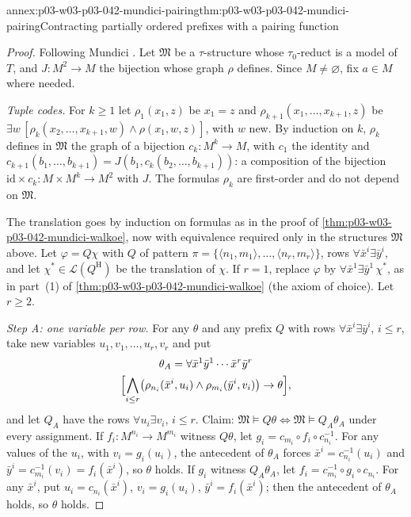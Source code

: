 \begin{annexitem}{annex:p03-w03-p03-042-mundici-pairing}{thm:p03-w03-p03-042-mundici-pairing}{Contracting partially ordered prefixes with a pairing function}
\begin{proof}
Following Mundici \cite[p.~214]{Mundici1985OtherQuantifiers}.  Let
\(\mathfrak M\) be a \(\tau\)-structure whose \(\tau_0\)-reduct is a model
of \(T\), and \(J:M^2\to M\) the bijection whose graph \(\rho\) defines.
Since \(M\neq\varnothing\), fix \(a\in M\) where needed.

\emph{Tuple codes.}  For \(k\geq1\) let \(\rho_1(x_1,z)\) be \(x_1=z\) and
\(\rho_{k+1}(x_1,\ldots,x_{k+1},z)\) be \(\exists w\,[\rho_k(x_2,\ldots,
x_{k+1},w)\wedge\rho(x_1,w,z)]\), with \(w\) new.  By induction on \(k\),
\(\rho_k\) defines in \(\mathfrak M\) the graph of a bijection
\(c_k:M^k\to M\), with \(c_1\) the identity and
\(c_{k+1}(b_1,\ldots,b_{k+1})=J(b_1,c_k(b_2,\ldots,b_{k+1}))\): a
composition of the bijection \(\mathrm{id}\times c_k:M\times M^k\to M^2\)
with \(J\).  The formulas \(\rho_k\) are first-order and do not depend
on \(\mathfrak M\).

The translation goes by induction on formulas as in the proof of
\cref{thm:p03-w03-p03-042-mundici-walkoe}, now with equivalence required
only in the structures \(\mathfrak M\) above.  Let \(\varphi=Q\chi\) with
\(Q\) of pattern \(\pi=\{\langle n_1,m_1\rangle,\ldots,\langle
n_r,m_r\rangle\}\), rows \(\forall\bar x^i\exists\bar y^i\), and let
\(\chi^\ast\in\mathscr L(Q^{\mathrm H})\) be the translation of \(\chi\).
If \(r=1\), replace \(\varphi\) by \(\forall\bar x^1\exists\bar
y^1\,\chi^\ast\), as in part~(1) of
\cref{thm:p03-w03-p03-042-mundici-walkoe} (the axiom of choice).  Let
\(r\geq2\).

\emph{Step A: one variable per row.}  For any \(\theta\) and any prefix
\(Q\) with rows \(\forall\bar x^i\exists\bar y^i\), \(i\le r\), take new
variables \(u_1,v_1,\ldots,u_r,v_r\) and put
\begin{multline*}
 \theta_A=\forall\bar x^1\bar y^1\cdots\bar x^r\bar y^r\\
 \Bigl[\bigwedge_{i\le r}\bigl(\rho_{n_i}(\bar x^i,u_i)\wedge
 \rho_{m_i}(\bar y^i,v_i)\bigr)\to\theta\Bigr],
\end{multline*}
and let \(Q_A\) have the rows \(\forall u_i\exists v_i\), \(i\le r\).
Claim: \(\mathfrak M\models Q\theta\iff\mathfrak M\models Q_A\theta_A\)
under every assignment.  If \(f_i:M^{n_i}\to M^{m_i}\) witness \(Q\theta\),
let \(g_i=c_{m_i}\circ f_i\circ c_{n_i}^{-1}\).  For any values of the
\(u_i\), with \(v_i=g_i(u_i)\), the antecedent of \(\theta_A\) forces
\(\bar x^i=c_{n_i}^{-1}(u_i)\) and \(\bar y^i=c_{m_i}^{-1}(v_i)=f_i(\bar
x^i)\), so \(\theta\) holds.  If \(g_i\) witness \(Q_A\theta_A\), let
\(f_i=c_{m_i}^{-1}\circ g_i\circ c_{n_i}\).  For any \(\bar x^i\), put
\(u_i=c_{n_i}(\bar x^i)\), \(v_i=g_i(u_i)\), \(\bar y^i=f_i(\bar x^i)\);
then the antecedent of \(\theta_A\) holds, so \(\theta\) holds.


\end{proof}
\end{annexitem}
